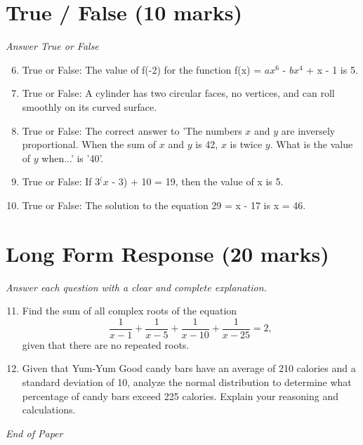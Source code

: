 \documentclass[12pt]{article}
\begin{document}
\section*{True / False (10 marks)}
\textit{Answer True or False}
\begin{enumerate}[label=\arabic*.]
\setcounter{enumi}{5}
\item True or False: The value of f(-2) for the function f(x) = $ax^6$ - $bx^4$ + x - 1 is 5.
\item True or False: A cylinder has two circular faces, no vertices, and can roll smoothly on its curved surface.
\item True or False: The correct answer to 'The numbers $x$ and $y$ are inversely proportional. When the sum of $x$ and $y$ is 42, $x$ is twice $y$. What is the value of $y$ when...' is '40'.
\item True or False: If $3^(x$ - 3) + 10 = 19, then the value of x is 5.
\item True or False: The solution to the equation 29 = x - 17 is x = 46.
\end{enumerate}

\section*{Long Form Response (20 marks)}
\textit{Answer each question with a clear and complete explanation.}
\begin{enumerate}[label=\arabic*.]
\setcounter{enumi}{10}
\item Find the sum of all complex roots of the equation \[\frac{1}{x-1} + \frac{1}{x-5} + \frac{1}{x-10} + \frac{1}{x-25} = 2,\]given that there are no repeated roots.
\item Given that Yum-Yum Good candy bars have an average of 210 calories and a standard deviation of 10, analyze the normal distribution to determine what percentage of candy bars exceed 225 calories. Explain your reasoning and calculations.
\end{enumerate}

\vfill
\noindent\textit{End of Paper}
\end{document}
